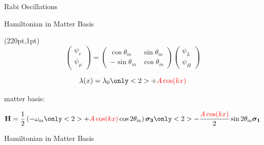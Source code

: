 \documentclass[9pt]{beamer}
\begin{document}
\begin{darkframes}
\begin{frame}{Rabi Oscillations}
{}


\end{frame}



\begin{frame}{Hamiltonian in Matter Basis}

\begin{textblock*}{10pt}(220pt,1pt)
\small
\begin{equation*}
\begin{pmatrix}
\psi_e\\
\psi_\mu
\end{pmatrix} = \begin{pmatrix}
\cos \theta_m & \sin\theta_m \\
-\sin \theta_m & \cos \theta_m
\end{pmatrix}\begin{pmatrix}
\psi_L\\
\psi_H
\end{pmatrix}
\end{equation*}

\end{textblock*}


\begin{tcolorbox}[title=Matter Potential]
\begin{equation*}
    \lambda(x)  = \lambda_0 \only<2>{ + {\color{red}A\cos(k x)} }
\end{equation*}
\end{tcolorbox}




\begin{tcolorbox}[title=Basis]

 matter basis:


\begin{equation*}
    \mathbf H = \frac{1}{2}\left( - \omega_{\mathrm{m}}
    \only<2>{
    + {\color{red}A\cos(kx)} \cos 2\theta_{\mathrm{m}}
    }
    \right) \boldsymbol{\sigma_3}
    \only<2>{
    - \frac{{\color{red}A\cos(kx) } }{2} \sin 2\theta_{\mathrm{m}} \boldsymbol{\sigma_1}
    }
\end{equation*}


\end{tcolorbox}






\end{frame}






\begin{frame}{Hamiltonian in Matter Basis}


\end{frame}
\end{darkframes}
\end{document}
